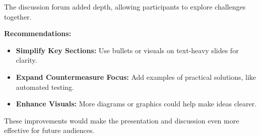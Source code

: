 \documentclass{article}
\begin{document}
The discussion forum added depth, allowing participants to explore challenges together.

\textbf{Recommendations:}

\begin{itemize}
    \item \textbf{Simplify Key Sections:} Use bullets or visuals on text-heavy slides for clarity.
    \item \textbf{Expand Countermeasure Focus:} Add examples of practical solutions, like automated testing.
    \item \textbf{Enhance Visuals:} More diagrams or graphics could help make ideas clearer.
\end{itemize}

These improvements would make the presentation and discussion even more effective for future audiences.
\end{document}
